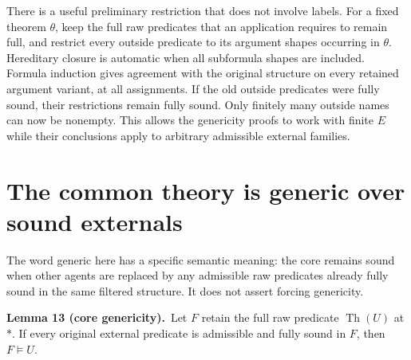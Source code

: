 \documentclass[11pt]{article}
\newcommand{\Th}{\operatorname{Th}}
\newcommand{\statement}[2]{\par\textbf{#1.}\ #2\par}
\begin{document}
There is a useful preliminary restriction that does not involve
labels. For a fixed theorem $\theta$, keep the full raw predicates
that an application requires to remain full, and restrict every
outside predicate to its argument shapes occurring in $\theta$.
Hereditary closure is automatic when all subformula shapes are
included. Formula induction gives agreement with the original
structure on every retained argument variant, at all assignments.
If the old outside predicates were fully sound, their restrictions
remain fully sound. Only finitely many outside names can now be
nonempty. This allows the genericity proofs to work with finite $E$
while their conclusions apply to arbitrary admissible external families.

\section{The common theory is generic over sound externals}\label{sec:core}

The word generic here has a specific semantic meaning: the core
remains sound when other agents are replaced by any admissible raw
predicates already fully sound in the same filtered structure.
It does not assert forcing genericity.

\statement{Lemma 13 (core genericity)}{Let $F$ retain the full raw
predicate $\Th(U)$ at $*$. If every original external predicate is
admissible and fully sound in $F$, then $F\models U$.}
\end{document}
